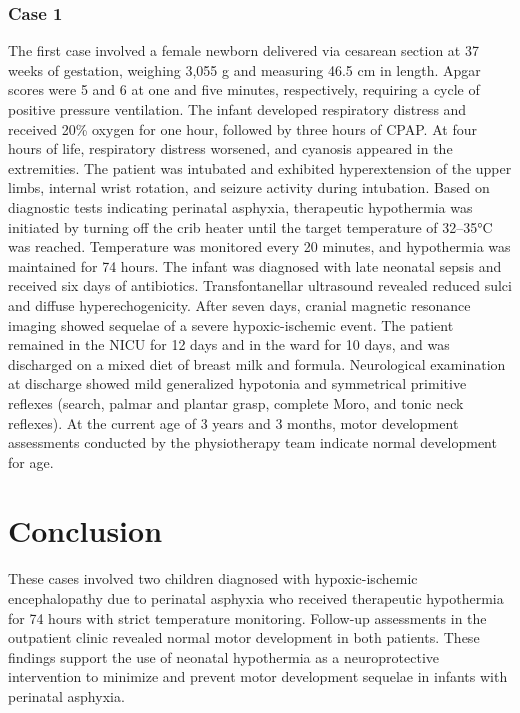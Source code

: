 \documentclass[11pt,a4paper]{article}
\begin{document}
	\subsubsection{Case 1}
	The first case involved a female newborn delivered via cesarean section at 37 weeks of gestation, weighing 3,055 g and measuring 46.5 cm in length. Apgar scores were 5 and 6 at one and five minutes, respectively, requiring a cycle of positive pressure ventilation. The infant developed respiratory distress and received 20\% oxygen for one hour, followed by three hours of CPAP. At four hours of life, respiratory distress worsened, and cyanosis appeared in the extremities. The patient was intubated and exhibited hyperextension of the upper limbs, internal wrist rotation, and seizure activity during intubation. Based on diagnostic tests indicating perinatal asphyxia, therapeutic hypothermia was initiated by turning off the crib heater until the target temperature of 32–35°C was reached. Temperature was monitored every 20 minutes, and hypothermia was maintained for 74 hours. The infant was diagnosed with late neonatal sepsis and received six days of antibiotics. Transfontanellar ultrasound revealed reduced sulci and diffuse hyperechogenicity. After seven days, cranial magnetic resonance imaging showed sequelae of a severe hypoxic-ischemic event. The patient remained in the NICU for 12 days and in the ward for 10 days, and was discharged on a mixed diet of breast milk and formula. Neurological examination at discharge showed mild generalized hypotonia and symmetrical primitive reflexes (search, palmar and plantar grasp, complete Moro, and tonic neck reflexes). At the current age of 3 years and 3 months, motor development assessments conducted by the physiotherapy team indicate normal development for age.
		
	\section{Conclusion}
	These cases involved two children diagnosed with hypoxic-ischemic encephalopathy due to perinatal asphyxia who received therapeutic hypothermia for 74 hours with strict temperature monitoring. Follow-up assessments in the outpatient clinic revealed normal motor development in both patients. These findings support the use of neonatal hypothermia as a neuroprotective intervention to minimize and prevent motor development sequelae in infants with perinatal asphyxia.
	
	\newpage
	
	\printbibliography[title=References]
		
\end{document}
